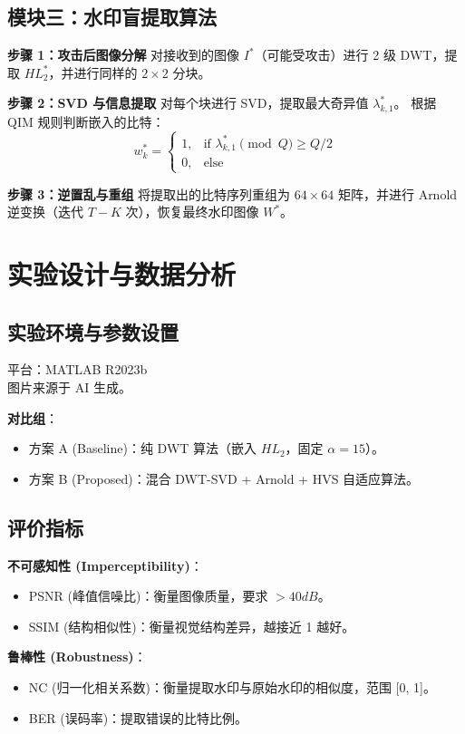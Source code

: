 \documentclass[zihao=-4, a4paper]{ctexart} %
\begin{document}
	\subsection{模块三：水印盲提取算法}
	\textbf{步骤 1：攻击后图像分解}
	对接收到的图像 $I^*$（可能受攻击）进行 2 级 DWT，提取 $HL^*_2$，并进行同样的 $2 \times 2$ 分块。
	
	\textbf{步骤 2：SVD 与信息提取}
	对每个块进行 SVD，提取最大奇异值 $\lambda^*_{k,1}$。
	根据 QIM 规则判断嵌入的比特：
	\[ w^*_k = \begin{cases} 1, & \text{if } \lambda^*_{k,1} \pmod Q \ge Q/2 \\ 0, & \text{else} \end{cases} \]
	
	\textbf{步骤 3：逆置乱与重组}
	将提取出的比特序列重组为 $64 \times 64$ 矩阵，并进行 Arnold 逆变换（迭代 $T-K$ 次），恢复最终水印图像 $W^*$。
	
	\section{实验设计与数据分析}
	
	\subsection{实验环境与参数设置}
	平台：MATLAB R2023b \\
	图片来源于 AI 生成。
	
	\textbf{对比组}：
	\begin{itemize}
		\item 方案 A (Baseline)：纯 DWT 算法（嵌入 $HL_2$，固定 $\alpha=15$）。
		\item 方案 B (Proposed)：混合 DWT-SVD + Arnold + HVS 自适应算法。
	\end{itemize}
	
	\subsection{评价指标}
	\textbf{不可感知性 (Imperceptibility)}：
	\begin{itemize}
		\item PSNR (峰值信噪比)：衡量图像质量，要求 $>40dB$。
		\item SSIM (结构相似性)：衡量视觉结构差异，越接近 1 越好。
	\end{itemize}
	\textbf{鲁棒性 (Robustness)}：
	\begin{itemize}
		\item NC (归一化相关系数)：衡量提取水印与原始水印的相似度，范围 [0, 1]。
		\item BER (误码率)：提取错误的比特比例。
	\end{itemize}
	
\end{document}
